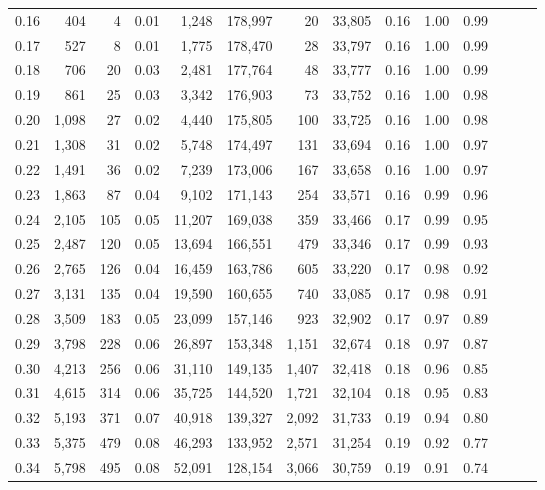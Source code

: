 \begin{tabular}{rrrrrrrrrrrrrr}
0.16 &    404 &      4 &  0.01 &    1,248 &  178,997 &      20 &  33,805 &  0.16 &  1.00 &      0.99 \\
0.17 &    527 &      8 &  0.01 &    1,775 &  178,470 &      28 &  33,797 &  0.16 &  1.00 &      0.99 \\
0.18 &    706 &     20 &  0.03 &    2,481 &  177,764 &      48 &  33,777 &  0.16 &  1.00 &      0.99 \\
0.19 &    861 &     25 &  0.03 &    3,342 &  176,903 &      73 &  33,752 &  0.16 &  1.00 &      0.98 \\
0.20 &  1,098 &     27 &  0.02 &    4,440 &  175,805 &     100 &  33,725 &  0.16 &  1.00 &      0.98 \\
0.21 &  1,308 &     31 &  0.02 &    5,748 &  174,497 &     131 &  33,694 &  0.16 &  1.00 &      0.97 \\
0.22 &  1,491 &     36 &  0.02 &    7,239 &  173,006 &     167 &  33,658 &  0.16 &  1.00 &      0.97 \\
0.23 &  1,863 &     87 &  0.04 &    9,102 &  171,143 &     254 &  33,571 &  0.16 &  0.99 &      0.96 \\
0.24 &  2,105 &    105 &  0.05 &   11,207 &  169,038 &     359 &  33,466 &  0.17 &  0.99 &      0.95 \\
0.25 &  2,487 &    120 &  0.05 &   13,694 &  166,551 &     479 &  33,346 &  0.17 &  0.99 &      0.93 \\
0.26 &  2,765 &    126 &  0.04 &   16,459 &  163,786 &     605 &  33,220 &  0.17 &  0.98 &      0.92 \\
0.27 &  3,131 &    135 &  0.04 &   19,590 &  160,655 &     740 &  33,085 &  0.17 &  0.98 &      0.91 \\
0.28 &  3,509 &    183 &  0.05 &   23,099 &  157,146 &     923 &  32,902 &  0.17 &  0.97 &      0.89 \\
0.29 &  3,798 &    228 &  0.06 &   26,897 &  153,348 &   1,151 &  32,674 &  0.18 &  0.97 &      0.87 \\
0.30 &  4,213 &    256 &  0.06 &   31,110 &  149,135 &   1,407 &  32,418 &  0.18 &  0.96 &      0.85 \\
0.31 &  4,615 &    314 &  0.06 &   35,725 &  144,520 &   1,721 &  32,104 &  0.18 &  0.95 &      0.83 \\
0.32 &  5,193 &    371 &  0.07 &   40,918 &  139,327 &   2,092 &  31,733 &  0.19 &  0.94 &      0.80 \\
0.33 &  5,375 &    479 &  0.08 &   46,293 &  133,952 &   2,571 &  31,254 &  0.19 &  0.92 &      0.77 \\
0.34 &  5,798 &    495 &  0.08 &   52,091 &  128,154 &   3,066 &  30,759 &  0.19 &  0.91 &      0.74 \\

\end{tabular}
